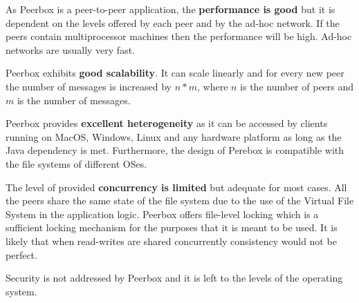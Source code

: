 As Peerbox is a peer-to-peer application, the \textbf{performance is good} but it is dependent on the levels offered by each peer and by the ad-hoc network. If the peers contain multiprocessor machines then the performance will be high. Ad-hoc networks are usually very fast.




Peerbox exhibits \textbf{good scalability}. It can scale linearly and for every new peer the number of messages is increased by $n*m$, where $n$ is the number of peers and $m$ is the number of messages. 



Peerbox provides \textbf{excellent heterogeneity} as it can be accessed by clients running on MacOS, Windows, Linux and any hardware platform as long as the Java dependency is met. Furthermore, the design of Perebox is compatible with the file systems of different OSes.





The level of provided \textbf{concurrency is limited} but adequate for most cases. All the peers share the same state of the file system due to the use of the Virtual File System in the application logic. Peerbox offers file-level locking which is a sufficient locking mechanism for the purposes that it is meant to be used. It is likely that when read-writes are shared concurrently consistency would not be perfect.

Security is not addressed by Peerbox and it is left to the levels of the operating system.


